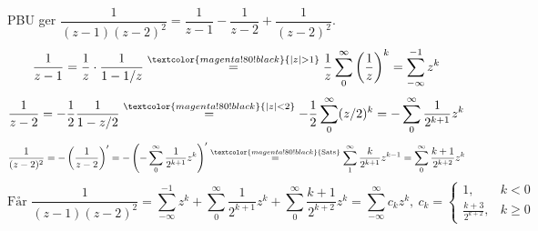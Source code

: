PBU ger $\dfrac{1}{(z - 1)(z - 2)^2} = \dfrac{1}{z - 1} - \dfrac{1}{z - 2} + \dfrac{1}{(z - 2)^2}$.
\[ \frac{1}{z - 1} = \frac{1}{z} \cdot \frac{1}{1 - 1/z} \overset{\textcolor{magenta!80!black}{|z| > 1}}{=} \frac{1}{z} \sum_0^\infty \left( \frac{1}{z} \right)^k = \sum_{-\infty}^{-1} z^k \]
\[ \frac{1}{z - 2} = -\frac{1}{2} \frac{1}{1 - z/2} \overset{\textcolor{magenta!80!black}{|z| < 2}}{=} -\frac{1}{2} \sum_0^\infty (z/2)^k = -\sum_0^\infty \frac{1}{2^{k+1}} z^k \]
\[ \frac{1}{(z - 2)^2} = -\left( \frac{1}{z - 2} \right)' = -\left( -\sum_0^\infty \frac{1}{2^{k+1}} z^k \right)' \overset{\textcolor{magenta!80!black}{\text{Sats}}}{=} \sum_1^\infty \frac{k}{2^{k+1}} z^{k-1} = \sum_0^\infty \frac{k + 1}{2^{k+2}} z^k \]
\[ \text{Får } \frac{1}{(z - 1)(z - 2)^2} = \sum_{-\infty}^{-1} z^k + \sum_0^\infty \frac{1}{2^{k+1}} z^k + \sum_0^\infty \frac{k + 1}{2^{k+2}} z^k = \sum_{-\infty}^\infty c_k z^k,\ c_k = \begin{cases} 1, & k < 0 \\ \frac{k + 3}{2^{k+2}}, & k \ge 0 \end{cases} \]
